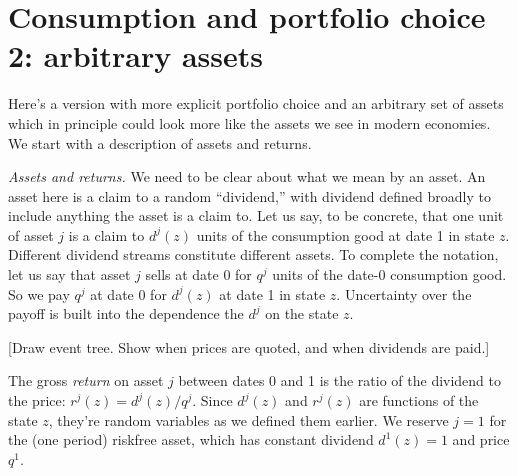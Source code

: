 \begin{comment}
The definition $ r(z) = 1/Q(z)$ gives us
\begin{eqnarray*}
       \{ \beta p(z) u'[c_1(z)] / u'(c_0) \} r(z)  &=& 1 ,
\end{eqnarray*}
a variant of our favorite equation.
It's not all that useful here,
because $r(z)$ for these assets is zero in all states but one,
but if we sum over $z$ we get
\begin{eqnarray*}
     \sum_z  \frac { \beta p(z) u'[c_1(z)] }{ u'(c_0)}\ r(z)  &=&
     E \left( \frac {\beta u'(c_1)}{u'(c_0)} \ r \right)
     \;\;=\;\; 1 ,
     \label{eq:euler-stochastic}
\end{eqnarray*}
a stochastic version of (\ref{eq:euler-deterministic}).
It's a somewhat strange object in this context,
since $r(z)$ is zero in all states by one,
but it illustrates the underlying unity of what we're doing.
\end{comment}


\section{Consumption and portfolio choice 2:  arbitrary assets}

Here's a version with more explicit portfolio choice
and an arbitrary set of assets which in principle could
look more like the assets we see in modern economies.
We start with a description of assets and returns.

{\it Assets and returns.\/}
We need to be clear about what we mean by an asset.
An asset here is a claim to a random ``dividend,''
with dividend defined broadly to include anything the asset is a claim to.
Let us say, to be concrete, that one unit of asset $j$ is a claim to $d^j(z)$ units
of the consumption good at date 1 in state $z$.
Different dividend streams constitute different assets.
To complete the notation,
let us say that asset $j$ sells at date 0
for $q^j$ units of the date-0 consumption good.
So we pay $q^j$ at date 0 for $d^j(z)$ at date 1 in state $z$.
Uncertainty over the payoff is built into the dependence
the $d^j$ on the state $z$.

[Draw event tree. Show when prices are quoted, and when dividends are paid.]

The gross {\it return\/} on asset $j$ between dates 0 and 1
is the ratio of the dividend to the price: $r^j(z) = d^j(z)/q^j$.
Since $d^j(z)$ and $r^j(z)$ are functions of the state $z$,
they're random variables as we defined them earlier.
We reserve $j=1$ for the (one period) riskfree asset,
which has constant dividend $d^1(z) = 1$ and price $q^1$.

